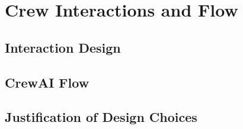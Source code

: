 \section{Crew Interactions and Flow}
\label{sec:crew_interaction}
\subsection{Interaction Design}
\subsection{CrewAI Flow}
\subsection{Justification of Design Choices}







